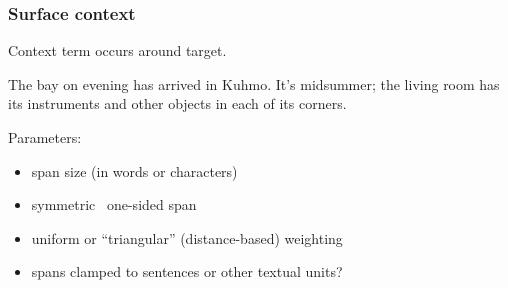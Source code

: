 \documentclass[t]{beamer} %
\begin{document}
\begin{frame}
  \frametitle{Surface context}
  
  \begin{center}
    Context term occurs  around target.
  \end{center}

  The  bay on  evening has arrived in Kuhmo. It's midsummer; the living room has its instruments and other objects in each of its corners.
  $\quad$ \primary{[L3/R3 span, $k = 6$]}
  
  \gap
  Parameters:
  \begin{itemize}
  \item span size (in words or characters)
  \item symmetric \vs\ one-sided span
  \item uniform or ``triangular'' (distance-based) weighting 
  \item spans clamped to sentences or other textual units?
  \end{itemize}
\end{frame}
\end{document}
